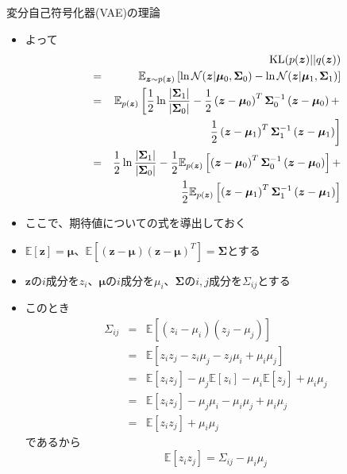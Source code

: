 \documentclass[dvipdfmx,notheorems,t]{beamer}
\begin{document}
\begin{frame}{変分自己符号化器(VAE)の理論}
\begin{itemize}
\begin{itemize}
		\item よって
		\begin{eqnarray}
			&& \operatorname{KL}(p(\bm{z}) || q(\bm{z})) \nonumber \\
			&=& \mathbb{E}_{\bm{z} \sim p(\bm{z})} \left[ \ln \mathcal{N}(\bm{z} | \bm{\mu}_0, \bm{\Sigma}_0) - \ln \mathcal{N}(\bm{z} | \bm{\mu}_1, \bm{\Sigma}_1) \right] \nonumber \\
			&=& \mathbb{E}_{p(\bm{z})} \left[ \frac{1}{2} \ln \frac{|\bm{\Sigma}_1|}{|\bm{\Sigma}_0|} - \frac{1}{2} \left( \bm{z} - \bm{\mu}_0 \right)^T \bm{\Sigma}_0^{-1} \left( \bm{z} - \bm{\mu}_0 \right) + \right. \nonumber \\
			&& \qquad \left. \frac{1}{2} \left( \bm{z} - \bm{\mu}_1 \right)^T \bm{\Sigma}_1^{-1} \left( \bm{z} - \bm{\mu}_1 \right) \right] \\
			&=& \frac{1}{2} \ln \frac{|\bm{\Sigma}_1|}{|\bm{\Sigma}_0|} - \frac{1}{2} \mathbb{E}_{p(\bm{z})} \left[ \left( \bm{z} - \bm{\mu}_0 \right)^T \bm{\Sigma}_0^{-1} \left( \bm{z} - \bm{\mu}_0 \right) \right] + \nonumber \\
			&& \qquad \frac{1}{2} \mathbb{E}_{p(\bm{z})} \left[ \left( \bm{z} - \bm{\mu}_1 \right)^T \bm{\Sigma}_1^{-1} \left( \bm{z} - \bm{\mu}_1 \right) \right]
		\end{eqnarray}
		
		\item ここで、期待値についての式を導出しておく
		\item $\mathbb{E} \left[ \bm{z} \right] = \bm{\mu}$、$\mathbb{E} \left[ \left( \bm{z} - \bm{\mu} \right) \left( \bm{z} - \bm{\mu} \right)^T \right] = \bm{\Sigma}$とする
		\item $\bm{z}$の$i$成分を$z_i$、$\bm{\mu}$の$i$成分を$\mu_i$、$\bm{\Sigma}$の$i, j$成分を$\Sigma_{ij}$とする
		\newline
		
		\item このとき
		\begin{eqnarray}
			\Sigma_{ij}
			&=& \mathbb{E} \left[ \left( z_i - \mu_i \right) \left( z_j - \mu_j \right) \right] \nonumber \\
			&=& \mathbb{E} \left[ z_i z_j - z_i \mu_j - z_j \mu_i + \mu_i \mu_j \right] \nonumber \\
			&=& \mathbb{E} \left[ z_i z_j \right] - \mu_j \mathbb{E} \left[ z_i \right] - \mu_i \mathbb{E} \left[ z_j \right] + \mu_i \mu_j \nonumber \\
			&=& \mathbb{E} \left[ z_i z_j \right] - \mu_j \mu_i - \mu_i \mu_j + \mu_i \mu_j \nonumber \\
			&=& \mathbb{E} \left[ z_i z_j \right] + \mu_i \mu_j
		\end{eqnarray}
		であるから
		\begin{equation}
			\mathbb{E} \left[ z_i z_j \right] = \Sigma_{ij} - \mu_i \mu_j
		\end{equation}
		

\end{itemize}
\end{itemize}
\end{frame}
\end{document}
